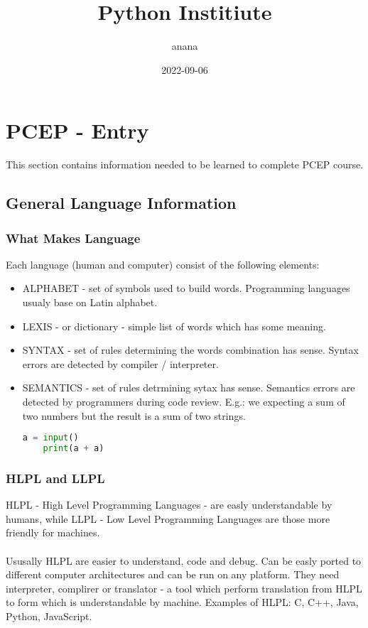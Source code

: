 \documentclass{article}
\title{Python Institiute}
\author{anana}
\date{2022-09-06}
\begin{document}
	\maketitle

	\newpage
	\tableofcontents
	
	\newpage
	\section{PCEP - Entry}
	This section contains information needed to be learned to complete PCEP course.
	\subsection{General Language Information}
	\subsubsection{What Makes Language}
	Each language (human and computer) consist of the following elements:
	\begin{itemize}
	\item ALPHABET - set of symbols used to build words. Programming languages usualy base on Latin alphabet.
	\item LEXIS - or dictionary - simple list of words which has some meaning.
	\item SYNTAX - set of rules determining the words combination has sense. Syntax errors are detected by compiler / interpreter.
	\item SEMANTICS - set of rules detrmining sytax has sense. Semantics errors are detected by programmers during code review. E.g.: we expecting a sum of two numbers but the result is a sum of two strings.
	\begin{lstlisting}[language=Python]
	a = input()
	print(a + a)
	\end{lstlisting}
	\end{itemize}
	\subsubsection{HLPL and LLPL}
	HLPL - High Level Programming Languages - are easly understandable by humans, while LLPL - Low Level Programming Languages are those more friendly for machines. 
	\paragraph{}
	Ususally HLPL are easier to understand, code and debug. Can be easly ported to different computer architectures and can be run on any platform. They need interpreter, complirer or translator - a tool which perform translation from HLPL to form which is understandable by machine. Examples of HLPL: C, C++, Java, Python, JavaScript.
\end{document}
